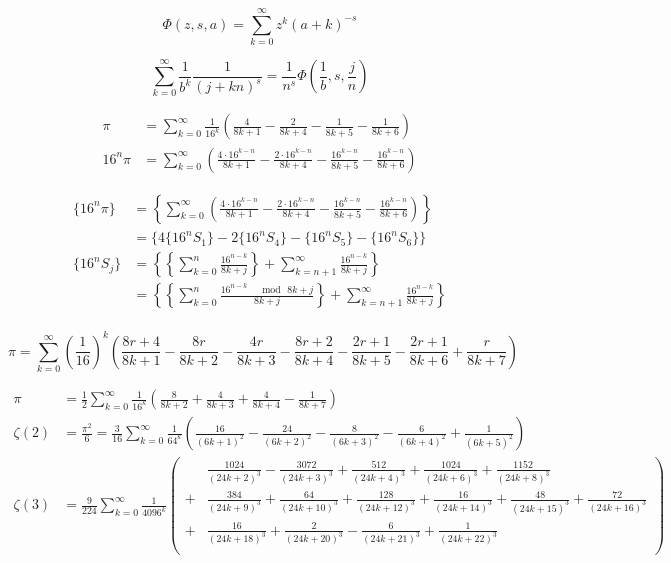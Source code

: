 $$\Phi(z,s,a)=\sum\limits_{k=0}^\infty{z^k}{(a+k)^{-s}}$$

$$\sum\limits_{k=0}^\infty{\frac{1}{b^k}\frac{1}{(j+kn)^s}}=\frac{1}{n^s}\Phi\left(\frac{1}{b},s,\frac{j}{n}\right)$$

$$\begin{aligned}
\pi&=\sum_{k=0}^{\infty}\frac{1}{16^k}\left(\frac{4}{8k+1}-\frac{2}{8k+4}-\frac{1}{8k+5}-\frac{1}{8k+6}\right)\\
16^{n}\pi&=\sum_{k=0}^{\infty}\left(\frac{4\cdot16^{k-n}}{8k+1}-\frac{2\cdot16^{k-n}}{8k+4}-\frac{16^{k-n}}{8k+5}-\frac{16^{k-n}}{8k+6}\right)
\end{aligned}$$

$$\begin{aligned}
\{16^n\pi\}&=\left\{\sum\limits_{k=0}^\infty{\left(\frac{4\cdot{16^{k-n}}}{8k+1}-\frac{2\cdot{16^{k-n}}}{8k+4}-\frac{16^{k-n}}{8k+5}-\frac{16^{k-n}}{8k+6}\right)}\right\}\\
&=\{4\{16^nS_1\}-2\{16^nS_4\}-\{16^nS_5\}-\{16^nS_6\}\}\\
\{16^nS_j\}&=\left\{\left\{\sum_{k=0}^n\frac{16^{n-k}}{8k+j}\right\}+\sum\limits_{k=n+1}^\infty{\frac{16^{n-k}}{8k+j}}\right\}\\
&=\left\{\left\{\sum_{k=0}^n\frac{16^{n-k}\quad\bmod\,8k+j}{8k+j}\right\}+\sum_{k=n+1}^\infty{\frac{16^{n-k}}{8k+j}}\right\}\\
\end{aligned}$$

$$\pi=\sum\limits_{k=0}^\infty{\left(\frac{1}{16}\right)^k}\left(\frac{8r+4}{8k+1}-\frac{8r}{8k+2}-\frac{4r}{8k+3}-\frac{8r+2}{8k+4}-\frac{2r+1}{8k+5}-\frac{2r+1}{8k+6}+\frac{r}{8k+7}\right)$$

$$\begin{aligned}
\pi&=\frac{1}{2}\sum\limits_{k=0}^\infty{\frac{1}{16^k}}\left(\frac{8}{8k+2}+\frac{4}{8k+3}+\frac{4}{8k+4}-\frac{1}{8k+7}\right)\\
\zeta(2)&=\frac{\pi^2}{6}=\frac{3}{16}\sum\limits_{k=0}^\infty{\frac{1}{64^k}}\left(\frac{16}{(6k+1)^2}-\frac{24}{(6k+2)^2}-\frac{8}{(6k+3)^2}-\frac{6}{(6k+4)^2}+\frac{1}{(6k+5)^2}\right)\\
\zeta(3)&=\frac{9}{224}\sum\limits_{k=0}^\infty{\frac{1}{4096^k}}
\left(\begin{aligned}
&\frac{1024}{(24k+2)^3}-\frac{3072}{(24k+3)^3}+\frac{512}{(24k+4)^3}+\frac{1024}{(24k+6)^3}+\frac{1152}{(24k+8)^3}\\
+&\frac{384}{(24k+9)^3}+\frac{64}{(24k+10)^3}+\frac{128}{(24k+12)^3}+\frac{16}{(24k+14)^3}+\frac{48}{(24k+15)^3}+\frac{72}{(24k+16)^3}\\
+&\frac{16}{(24k+18)^3}+\frac{2}{(24k+20)^3}-\frac{6}{(24k+21)^3}+\frac{1}{(24k+22)^3}\\
\end{aligned}\right)\\
\end{aligned}$$


